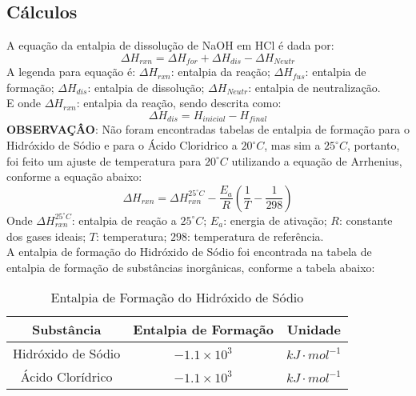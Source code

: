         \subsection{Cálculos}\label{sec:calculos}
            \indent A equação da entalpia de dissolução de NaOH em HCl é dada por:
            \begin{equation}
                \Delta H_{rxn} = \Delta H_{for} + \Delta H_{dis} - \Delta H_{Neutr}
			\end{equation}
			\indent A legenda para equação é: $\Delta H_{rxn}$: entalpia da reação; $\Delta H_{fus}$: entalpia de formação; $\Delta H_{dis}$: entalpia de dissolução; $\Delta H_{Neutr}$: entalpia de neutralização.\\
			\indent E onde $\Delta H_{rxn}$: entalpia da reação, sendo descrita como:\
			\begin{equation}
				\Delta H_{dis} = H_{inicial} - H_{final}
			\end{equation}
			\indent \textbf{OBSERVAÇÂO}: Não foram encontradas tabelas de entalpia de formação para o Hidróxido de Sódio e para o Ácido Cloridrico a $20^{\circ}C$, mas sim a
            $25^{\circ}C$, portanto, foi feito um ajuste de temperatura para $20^{\circ}C$ utilizando a equação de Arrhenius, conforme a equação abaixo:
            \begin{equation}
                \Delta H_{rxn} = \Delta H_{rxn}^{25^{\circ}C} - \frac{E_{a}}{R} \left( \frac{1}{T} - \frac{1}{298} \right)
            \end{equation}
            \indent Onde $\Delta H_{rxn}^{25^{\circ}C}$: entalpia de reação a $25^{\circ}C$; $E_{a}$: energia de ativação; $R$: constante dos gases ideais; $T$: temperatura; $298$: temperatura de referência.\\
            \indent A entalpia de formação do Hidróxido de Sódio foi encontrada na tabela de entalpia de formação de substâncias inorgânicas, conforme a tabela abaixo:
            \begin{table}[h]
                \centering
                \begin{tabular}{|c|c|c|}
                    \hline
                    \textbf{Substância} & \textbf{Entalpia de Formação} & \textbf{Unidade} \\
                    \hline
                    Hidróxido de Sódio & $- 1.1 \times 10^{3}$ & $kJ \cdot mol^{-1}$ \\
                    \hline
                    Ácido Clorídrico & $- 1.1 \times 10^{3}$ & $kJ \cdot mol^{-1}$ \\
                    \hline
                \end{tabular}
                \caption{Entalpia de Formação do Hidróxido de Sódio}
                \label{tab:enthalpy}
            \end{table}
